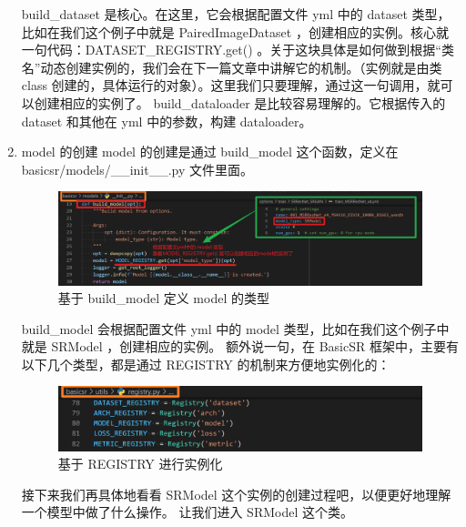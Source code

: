 \documentclass[../main.tex]{subfiles}
\begin{document}
\begin{enumerate}
build\_dataset 是核心。在这里，它会根据配置文件 yml 中的 dataset 类型，比如在我们这个例子中就是 PairedImageDataset ，创建相应的实例。核心就一句代码：DATASET\_REGISTRY.get() 。关于这块具体是如何做到根据“类名”动态创建实例的，我们会在下一篇文章中讲解它的机制。（实例就是由类 class 创建的，具体运行的对象）。这里我们只要理解，通过这一句调用，就可以创建相应的实例了。
build\_dataloader 是比较容易理解的。它根据传入的 dataset 和其他在 yml 中的参数，构建 dataloader。

\item model 的创建
model 的创建是通过 build\_model 这个函数，定义在 basicsr/models/\_\_init\_\_.py 文件里面。

\begin{figure}[H]
\begin{center}
    \includegraphics[width=0.7\linewidth]{figures/getting_start_11.png}
    \caption{基于 build\_model 定义 model 的类型}
    \label{fig:getting_start_11}
\end{center}
\vspace{-0.5cm}
\end{figure}

build\_model 会根据配置文件 yml 中的 model 类型，比如在我们这个例子中就是 SRModel ，创建相应的实例。
额外说一句，在 BasicSR 框架中，主要有以下几个类型，都是通过 REGISTRY 的机制来方便地实例化的：

\begin{figure}[H]
\begin{center}
    \includegraphics[width=0.7\linewidth]{figures/getting_start_12.png}
    \caption{基于 REGISTRY 进行实例化}
    \label{fig:getting_start_12}
\end{center}
\vspace{-0.5cm}
\end{figure}

接下来我们再具体地看看 SRModel 这个实例的创建过程吧，以便更好地理解一个模型中做了什么操作。
让我们进入 SRModel 这个类。


\end{enumerate}
\end{document}
